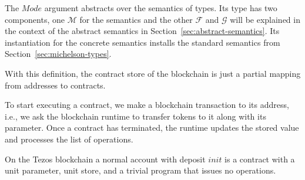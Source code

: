 The $Mode$ argument abstracts over the semantics of types. Its type
has two components, one $\mathcal{M}$ for the semantics and the other
$\mathcal{F}$ and $\mathcal{G}$ will be
explained in the context of the abstract semantics in Section~\ref{sec:abstract-semantics}.
\ConcreteMODE
Its instantiation for the concrete semantics installs the 
standard semantics from Section~\ref{sec:michelson-types}.
\ConcreteCMode

With this definition, the contract store of the blockchain is just a partial mapping from addresses
to contracts.
\ConcreteBlockchain

To start executing a contract, we make a blockchain transaction to its
address, i.e., we ask the blockchain runtime to transfer tokens to it along with its parameter.
Once a contract has terminated, the runtime updates the
stored value and processes the list of operations.

On the Tezos blockchain a normal account with deposit $init$ is a
contract with a unit parameter, unit store, and a trivial program that issues no operations.
\ConcreteAccount


